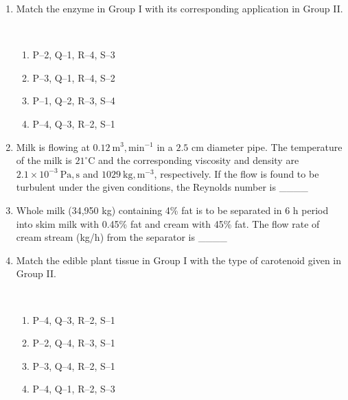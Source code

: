 \documentclass[journal,12pt,onecolumn]{IEEEtran}
\begin{document}
\begin{enumerate}[label=\arabic*)]
\item Match the enzyme in Group I with its corresponding application in Group II.



\hfill{} \\

\vspace{0.05cm}
\begin{enumerate}[label=\alph*)]
\item P–2, Q–1, R–4, S–3
\item P–3, Q–1, R–4, S–2
\item P–1, Q–2, R–3, S–4
\item P–4, Q–3, R–2, S–1
\end{enumerate}

\newpage

\item Milk is flowing at $0.12\ \mathrm{m^3,min^{-1}}$ in a $2.5$ cm diameter pipe. The temperature of the milk is $21^\circ$C and the corresponding viscosity and density are $2.1\times 10^{-3}\ \mathrm{Pa,s}$ and $1029\ \mathrm{kg,m^{-3}}$, respectively. If the flow is found to be turbulent under the given conditions, the Reynolds number is \_\_\_\_
\hfill{} \\

\vspace{0.5cm}

\item Whole milk (34,950 kg) containing 4\% fat is to be separated in 6 h period into skim milk with 0.45\% fat and cream with 45\% fat. The flow rate of cream stream (kg/h) from the separator is \_\_\_\_
\vspace{0.2cm}
\hfill{} \\

\vspace{0.5cm}

\item Match the edible plant tissue in Group I with the type of carotenoid given in Group II.



\hfill{} \\

\vspace{0.2cm}
\begin{enumerate}[label=\alph*)]
\item P–4, Q–3, R–2, S–1
\item P–2, Q–4, R–3, S–1
\item P–3, Q–4, R–2, S–1
\item P–4, Q–1, R–2, S–3
\end{enumerate}


\end{enumerate}
\end{document}
